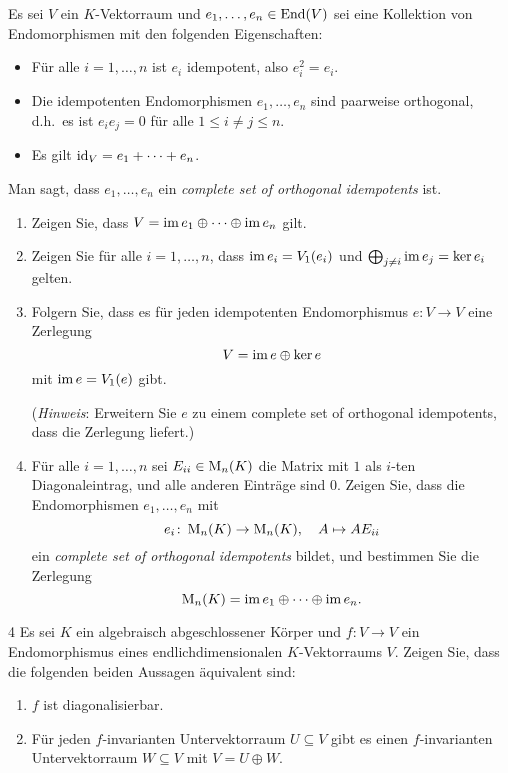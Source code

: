 \begin{question}[subtitle = Complete sets of orthogonal idempotents]{3}
  Es sei $V$ ein $K$-Vektorraum und $e_1, \dotsc, e_n \in \operatorname{End}(V)$ sei eine Kollektion von Endomorphismen mit den folgenden Eigenschaften:
  \begin{itemize}
    \item
      Für alle $i = 1, \dotsc, n$ ist $e_i$ idempotent, also $e_i^2 = e_i$.
    \item
      Die idempotenten Endomorphismen $e_1, \dotsc, e_n$ sind paarweise orthogonal, d.h.\ es ist $e_i e_j = 0$ für alle $1 \leq i \neq j \leq n$.
    \item
      Es gilt $\operatorname{id}_V = e_1 + \dotsb + e_n$.
  \end{itemize}
  Man sagt, dass $e_1, \dotsc, e_n$ ein \emph{complete set of orthogonal idempotents} ist.
  \begin{enumerate}[leftmargin=*]
    \item
      Zeigen Sie, dass $V = \operatorname{im} e_1 \oplus \dotsb \oplus \operatorname{im} e_n$ gilt.
    \item
      Zeigen Sie für alle $i = 1, \dotsc, n$, dass $\operatorname{im} e_i = V_1(e_i)$ und $\bigoplus_{j \neq i} \operatorname{im} e_j = \ker e_i$ gelten.
    \item
      Folgern Sie, dass es für jeden idempotenten Endomorphismus $e \colon V \to V$ eine Zerlegung
      \[
        V = \operatorname{im} e \oplus \ker e
      \]
      mit $\operatorname{im} e = V_1(e)$ gibt.
      
      (\emph{Hinweis}:
       Erweitern Sie $e$ zu einem complete set of orthogonal idempotents, dass die Zerlegung liefert.)
    \item
      Für alle $i = 1, \dotsc, n$ sei $E_{ii} \in \operatorname{M}_n(K)$ die Matrix mit $1$ als $i$-ten Diagonaleintrag, und alle anderen Einträge sind $0$.
      Zeigen Sie, dass die Endomorphismen $e_1, \dotsc, e_n$ mit
      \[
        e_i \colon \operatorname{M}_n(K) \to \operatorname{M}_n(K),
        \quad
        A \mapsto A E_{ii}
      \]
      ein \emph{complete set of orthogonal idempotents} bildet, und bestimmen Sie die Zerlegung
      \[
        \operatorname{M}_n(K) = \operatorname{im} e_1 \oplus \dotsb \oplus \operatorname{im} e_n.
      \]
  \end{enumerate}
\end{question}







\begin{question}[subtitle = Eine Charakterisierung von Diagonalisierbarkeit über direkte Komplemente]{4}
  Es sei $K$ ein algebraisch abgeschlossener Körper und $f \colon V \to V$ ein Endomorphismus eines endlichdimensionalen $K$-Vektorraums $V$.
  Zeigen Sie, dass die folgenden beiden Aussagen äquivalent sind:
  \begin{enumerate}
    \item
      $f$ ist diagonalisierbar.
    \item
      Für jeden $f$-invarianten Untervektorraum $U \subseteq V$ gibt es einen $f$-invarianten Untervektorraum $W \subseteq V$ mit $V = U \oplus W$.
  \end{enumerate}
\end{question}


